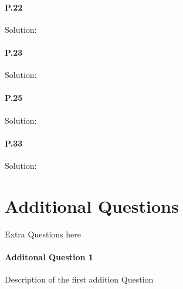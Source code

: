 \documentclass[12pt]{article}
\begin{document}
\paragraph{P.22}                                                                                                                                                     
Solution:                                                                                                                                                            
\paragraph{P.23}                                                                                                                                                     
Solution:                                                                                                                                                            
\paragraph{P.25}                                                                                                                                                     
Solution:                                                                                                                                                            
\paragraph{P.33}                                                                                                                                                     
Solution:

\section{Additional Questions}
Extra Questions here

\paragraph{Additonal Question 1}
Description of the first addition Question
\end{document}
